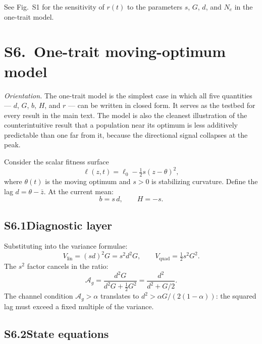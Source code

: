 \documentclass[11pt]{article}
\newcommand{\Ag}{\mathcal{A}_{g}}
\newcommand{\Vlin}{V_{\mathrm{lin}}}
\newcommand{\Vquad}{V_{\mathrm{quad}}}
\begin{document}
See Fig.~S1 for the sensitivity of $r(t)$ to the parameters
$s$, $G$, $d$, and $N_e$ in the one-trait model.

\section*{S6.~One-trait moving-optimum model}
\label{sec:onetrait}

\noindent\textit{Orientation.}
The one-trait model is the simplest case in which all five
quantities --- $d$, $G$, $b$, $H$, and $r$ --- can be written in
closed form.
It serves as the testbed for every result in the main text.
The model is also the cleanest illustration of the
counterintuitive result that a population near its optimum is
less additively predictable than one far from it, because the
directional signal collapses at the peak.

Consider the scalar fitness surface
\begin{equation}
\ell(z,t)
= \ell_0 - \tfrac{1}{2}s(z - \theta)^2,
\label{eq:S6_landscape}
\end{equation}
where $\theta(t)$ is the moving optimum and $s > 0$ is
stabilizing curvature.
Define the lag $d = \theta - \bar{z}$.
At the current mean:
\begin{equation}
b = s\,d, \qquad H = -s.
\label{eq:S6_bH}
\end{equation}

\subsection*{S6.1\quad Diagnostic layer}

Substituting into the variance formulae:
\begin{equation}
\Vlin = (sd)^2 G = s^2d^2G,
\qquad
\Vquad = \tfrac{1}{2}s^2G^2.
\label{eq:S6_VV}
\end{equation}
The $s^2$ factor cancels in the ratio:
\begin{equation}
\Ag = \frac{d^2G}{d^2G + \tfrac{1}{2}G^2}
    = \frac{d^2}{d^2 + G/2}.
\label{eq:S6_Ag}
\end{equation}
The channel condition $\Ag > \alpha$ translates to
$d^2 > \alpha G/(2(1-\alpha))$:
the squared lag must exceed a fixed multiple of the variance.

\subsection*{S6.2\quad State equations}
\end{document}
